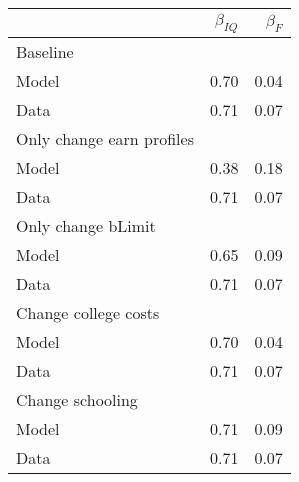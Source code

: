 \begin{tabular}{lrr}
\hline
  & $\beta_{IQ}$  & $\beta_{F}$  \\ 
\hline
Baseline &   &   \\ 
Model & 0.70  & 0.04  \\ 
Data & 0.71  & 0.07  \\ 
Only change earn profiles &   &   \\ 
Model & 0.38  & 0.18  \\ 
Data & 0.71  & 0.07  \\ 
Only change bLimit &   &   \\ 
Model & 0.65  & 0.09  \\ 
Data & 0.71  & 0.07  \\ 
Change college costs &   &   \\ 
Model & 0.70  & 0.04  \\ 
Data & 0.71  & 0.07  \\ 
Change schooling &   &   \\ 
Model & 0.71  & 0.09  \\ 
Data & 0.71  & 0.07  \\ 
\hline
\end{tabular}%
